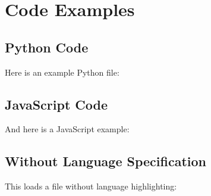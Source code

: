 \documentclass{article}
\begin{document}
\section{Code Examples}

\subsection{Python Code}
Here is an example Python file:



\subsection{JavaScript Code}
And here is a JavaScript example:



\subsection{Without Language Specification}
This loads a file without language highlighting:


\end{document}
